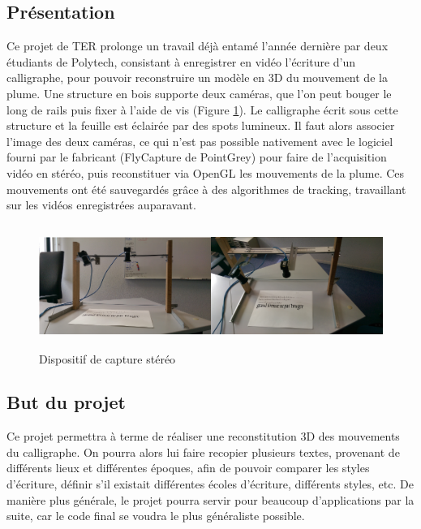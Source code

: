 \subsection{Présentation}

Ce projet de TER prolonge un travail déjà entamé l'année dernière par deux étudiants de Polytech, consistant à enregistrer en vidéo l'écriture d'un calligraphe, pour pouvoir reconstruire un modèle en 3D du mouvement de la plume. Une structure en bois supporte deux caméras, que l'on peut bouger le long de rails puis fixer à l'aide de vis (Figure \ref{cameras}). Le calligraphe écrit sous cette structure et la feuille est éclairée par des spots lumineux. Il faut alors associer l'image des deux caméras, ce qui n'est pas possible nativement avec le logiciel fourni par le fabricant (FlyCapture de PointGrey) pour faire de l'acquisition vidéo en stéréo, puis reconstituer via OpenGL les mouvements de la plume. Ces mouvements ont été sauvegardés grâce à des algorithmes de tracking, travaillant sur les vidéos enregistrées auparavant.

\begin{figure}[!h]
\centering
\includegraphics[width=\textwidth, height=4cm]{Modules/Picture/camerasPic.png}
\caption{Dispositif de capture stéréo}
\label{cameras}
\end{figure}


\subsection{But du projet}

Ce projet permettra à terme de réaliser une reconstitution 3D des mouvements du calligraphe. On pourra alors lui faire recopier plusieurs textes, provenant de différents lieux et différentes époques, afin de pouvoir comparer les styles d'écriture, définir s'il existait différentes écoles d'écriture, différents styles, etc. De manière plus générale, le projet pourra servir pour beaucoup d'applications par la suite, car le code final se voudra le plus généraliste possible.